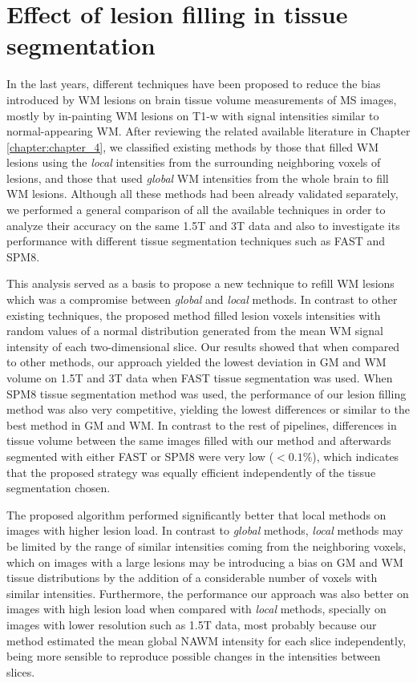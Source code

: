 \section{Effect of lesion filling in tissue segmentation}

In the last years, different techniques have been proposed to reduce the bias introduced by WM lesions on brain tissue volume measurements of MS images, mostly by in-painting WM lesions on T1-w with signal intensities similar to normal-appearing WM.  After reviewing the related available literature in Chapter \ref{chapter:chapter_4}, we classified existing methods by those that filled WM lesions using the \textit{local} intensities from the surrounding neighboring voxels of lesions, and those that used \textit{global} WM intensities from the whole brain to fill WM lesions. Although all these methods had been already validated separately, we performed a general comparison of all the available techniques in order to analyze their accuracy on the same 1.5T and 3T data and also to investigate its performance with different tissue segmentation techniques such as FAST and SPM8.

This analysis served as a basis to propose a new technique to refill WM lesions which was a compromise between \textit{global} and \textit{local} methods. In contrast to other existing techniques, the proposed method filled lesion voxels intensities with random values of a normal distribution generated from the mean WM signal intensity of each two-dimensional slice. Our results showed that when compared to other methods, our approach yielded the lowest deviation in GM and WM volume on 1.5T and 3T data when FAST tissue segmentation was used. When SPM8 tissue segmentation method was used, the performance of our lesion filling method was also very competitive, yielding the lowest differences or similar to the best method in GM and WM. In contrast to the rest of pipelines, differences in tissue volume between the same images filled with our method and afterwards segmented with either FAST or SPM8 were very low ($<0.1\%$), which indicates that the proposed strategy was equally efficient independently of the tissue segmentation chosen.

The proposed algorithm performed significantly better that local methods on images with higher lesion load. In contrast to \textit{global} methods, \textit{local} methods may be limited by the range of similar intensities coming from the neighboring voxels, which on images with a large lesions may be introducing a bias on GM and WM tissue distributions by the addition of a considerable number of voxels with similar intensities. Furthermore, the performance our approach was also better on images with high lesion load when compared with \textit{local} methods, specially on images with lower resolution such as 1.5T data, most probably because our method estimated the mean global NAWM intensity for each slice independently, being more sensible to reproduce possible changes in the intensities between slices.


